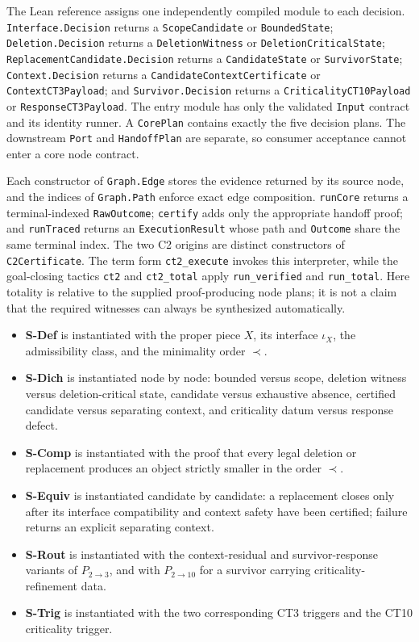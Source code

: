 The Lean reference assigns one independently compiled module to each
decision.  \texttt{Interface.Decision} returns a \texttt{ScopeCandidate}
or \texttt{BoundedState}; \texttt{Deletion.Decision} returns a
\texttt{DeletionWitness} or \texttt{DeletionCritical\allowbreak{}State};
\texttt{ReplacementCandidate.\allowbreak{}Decision} returns a \texttt{CandidateState}
or \texttt{SurvivorState}; \texttt{Context.Decision} returns a
\texttt{CandidateContext\allowbreak{}Certificate} or \texttt{ContextCT3\allowbreak{}Payload}; and
\texttt{Survivor.Decision} returns a \texttt{CriticalityCT10\allowbreak{}Payload} or
\texttt{ResponseCT3\allowbreak{}Payload}.  The entry module has only the validated
\texttt{Input} contract and its identity runner.  A \texttt{CorePlan}
contains exactly the five decision plans.  The downstream \texttt{Port}
and \texttt{HandoffPlan} are separate, so consumer acceptance cannot enter
a core node contract.

Each constructor of \texttt{Graph.Edge} stores the evidence returned by its
source node, and the indices of \texttt{Graph.Path} enforce exact edge
composition.  \texttt{runCore} returns a terminal-indexed
\texttt{RawOutcome}; \texttt{certify} adds only the appropriate handoff
proof; and \texttt{runTraced} returns an \texttt{ExecutionResult} whose
path and \texttt{Outcome} share the same terminal index.  The two C2
origins are distinct constructors of \texttt{C2Certificate}.  The term
form \texttt{ct2\_execute} invokes this interpreter, while the
goal-closing tactics \texttt{ct2} and \texttt{ct2\_total} apply
\texttt{run\_verified} and \texttt{run\_total}.  Here totality is relative
to the supplied proof-producing node plans; it is not a claim that the
required witnesses can always be synthesized automatically.

\begin{itemize}
\tightlist
\item \textbf{S-Def} is instantiated with the proper piece \(X\), its interface \(\iota_X\), the admissibility class, and the minimality order \(\prec\).
\item \textbf{S-Dich} is instantiated node by node: bounded versus scope, deletion witness versus deletion-critical state, candidate versus exhaustive absence, certified candidate versus separating context, and criticality datum versus response defect.
\item \textbf{S-Comp} is instantiated with the proof that every legal deletion or replacement produces an object strictly smaller in the order \(\prec\).
\item \textbf{S-Equiv} is instantiated candidate by candidate: a replacement closes only after its interface compatibility and context safety have been certified; failure returns an explicit separating context.
\item \textbf{S-Rout} is instantiated with the context-residual and survivor-response variants of \(P_{2\to3}\), and with \(P_{2\to10}\) for a survivor carrying criticality-refinement data.
\item \textbf{S-Trig} is instantiated with the two corresponding CT3 triggers and the CT10 criticality trigger.
\end{itemize}

